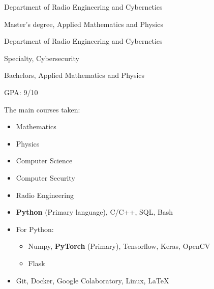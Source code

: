 Department of Radio Engineering and Cybernetics

Master's degree, Applied Mathematics and Physics

Department of Radio Engineering and Cybernetics

Specialty, Cybersecurity

Bachelors, Applied Mathematics and Physics 

GPA: 9/10

The main courses taken:

\begin{itemize}
	\item Mathematics %
	\item Physics %
	\item Computer Science %
	\item Computer Security %
	\item Radio Engineering %
\end{itemize}

\divider

\begin{itemize}
	\item \textbf{Python} (Primary language), C/C++, SQL, Bash%
	\item For Python:
	\begin{itemize}
		\item Numpy, \textbf{PyTorch} (Primary), Tensorflow, Keras, OpenCV
		\item Flask
	\end{itemize}    
	\item Git, Docker, Google Colaboratory, Linux, \LaTeX
\end{itemize}

